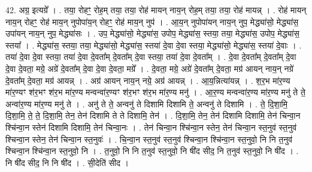 \documentclass[17pt]{extarticle}
\begin{document}
42. अग्र॒ इत्यग्रे᳚ । . तया॒ रोहꣳ॒॒ रोह॒म् तया॒ तया॒ रोह॑ मायन् नाय॒न् रोह॒म् तया॒ तया॒ रोह॑ मायन्न् । . रोह॑ मायन् नाय॒न् रोहꣳ॒॒ रोह॑ माय॒न् नुपोपा॑य॒न् रोहꣳ॒॒ रोह॑ माय॒न् नुप॑ । . आ॒य॒न् नुपोपा॑यन् नाय॒न् नुप॒ मेद्ध्या॑सो॒ मेद्ध्या॑स॒ उपा॑यन् नाय॒न् नुप॒ मेद्ध्या॑सः । . उप॒ मेद्ध्या॑सो॒ मेद्ध्या॑स॒ उपोप॒ मेद्ध्या॑स॒ स्तया॒ तया॒ मेद्ध्या॑स॒ उपोप॒ मेद्ध्या॑स॒ स्तया᳚ । . मेद्ध्या॑स॒ स्तया॒ तया॒ मेद्ध्या॑सो॒ मेद्ध्या॑स॒ स्तया॑ दे॒वा दे॒वा स्तया॒ मेद्ध्या॑सो॒ मेद्ध्या॑स॒ स्तया॑ दे॒वाः । . तया॑ दे॒वा दे॒वा स्तया॒ तया॑ दे॒वा दे॒वता᳚म् दे॒वता᳚म् दे॒वा स्तया॒ तया॑ दे॒वा दे॒वता᳚म् । . दे॒वा दे॒वता᳚म् दे॒वता᳚म् दे॒वा दे॒वा दे॒वता॒ मग्रे॒ अग्रे॑ दे॒वता᳚म् दे॒वा दे॒वा दे॒वता॒ मग्रे᳚ । . दे॒वता॒ मग्रे॒ अग्रे॑ दे॒वता᳚म् दे॒वता॒ मग्र॑ आयन् नाय॒न् नग्रे॑ दे॒वता᳚म् दे॒वता॒ मग्र॑ आयन्न् । . अग्र॑ आयन् नाय॒न् नग्रे॒ अग्र॑ आयन्न् । . आ॒य॒न्नित्या॑यन्न् । . श॒र॒भ मा॑र॒ण्य मा॑र॒ण्यꣳ श॑र॒भꣳ श॑र॒भ मा॑र॒ण्य मन्वन्वा॑र॒ण्यꣳ श॑र॒भꣳ श॑र॒भ मा॑र॒ण्य मनु॑ । . आ॒र॒ण्य मन्वन्वा॑र॒ण्य मा॑र॒ण्य मनु॑ ते ते॒ अन्वा॑र॒ण्य मा॑र॒ण्य मनु॑ ते । . अनु॑ ते ते॒ अन्वनु॑ ते दिशामि दिशामि ते॒ अन्वनु॑ ते दिशामि । . ते॒ दि॒शा॒मि॒ दि॒शा॒मि॒ ते॒ ते॒ दि॒शा॒मि॒ तेन॒ तेन॑ दिशामि ते ते दिशामि॒ तेन॑ । . दि॒शा॒मि॒ तेन॒ तेन॑ दिशामि दिशामि॒ तेन॑ चिन्वा॒न श्चि॑न्वा॒न स्तेन॑ दिशामि दिशामि॒ तेन॑ चिन्वा॒नः । . तेन॑ चिन्वा॒न श्चि॑न्वा॒न स्तेन॒ तेन॑ चिन्वा॒न स्त॒नुव॑ स्त॒नुव॑ श्चिन्वा॒न स्तेन॒ तेन॑ चिन्वा॒न स्त॒नुवः॑ । . चि॒न्वा॒न स्त॒नुव॑ स्त॒नुव॑ श्चिन्वा॒न श्चि॑न्वा॒न स्त॒नुवो॒ नि नि त॒नुव॑ श्चिन्वा॒न श्चि॑न्वा॒न स्त॒नुवो॒ नि । . त॒नुवो॒ नि नि त॒नुव॑ स्त॒नुवो॒ नि षी॑द सीद॒ नि त॒नुव॑ स्त॒नुवो॒ नि षी॑द । . नि षी॑द सीद॒ नि नि षी॑द । . सी॒देति॑ सीद । \newline
\pagebreak
{}
\end{document}

